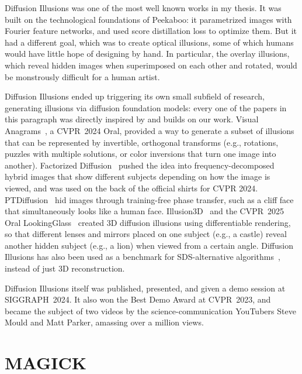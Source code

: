 Diffusion Illusions was one of the most well known works in my thesis. It was built on the technological foundations of Peekaboo: it parametrized images with Fourier feature networks, and used score distillation loss to optimize them. But it had a different goal, which was to create optical illusions, some of which humans would have little hope of designing by hand. In particular, the overlay illusions, which reveal hidden images when superimposed on each other and rotated, would be monstrously difficult for a human artist.

Diffusion Illusions ended up triggering its own small subfield of research, generating illusions via diffusion foundation models: every one of the papers in this paragraph was directly inspired by and builds on our work.
Visual Anagrams~\cite{geng2023visualanagrams}, a CVPR~2024 Oral, provided a way to generate a subset of illusions that can be represented by invertible, orthogonal transforms (e.g., rotations, puzzles with multiple solutions, or color inversions that turn one image into another). Factorized Diffusion~\cite{geng2024factorized} pushed the idea into frequency-decomposed hybrid images that show different subjects depending on how the image is viewed, and was used on the back of the official shirts for CVPR 2024.
  PTDiffusion~\cite{gao2025ptdiffusion} hid images through training-free phase transfer, such as a cliff face that simultaneously looks like a human face.
  Illusion3D~\cite{feng2024illusion3d} and the CVPR~2025 Oral LookingGlass~\cite{chang2025lookingglass} created 3D diffusion illusions using differentiable rendering, so that different lenses and mirrors placed on one subject (e.g., a castle) reveal another hidden subject (e.g., a lion) when viewed from a certain angle.
Diffusion Illusions has also been used as a benchmark for SDS-alternative algorithms~\cite{mcallister2024sdsbridge}, instead of just 3D reconstruction.


Diffusion Illusions itself was published, presented, and given a demo session at SIGGRAPH~2024. It also won the Best Demo Award at CVPR~2023, and became the subject of two videos by the science-communication YouTubers Steve Mould and Matt Parker, amassing over a million views.


\section{MAGICK}


